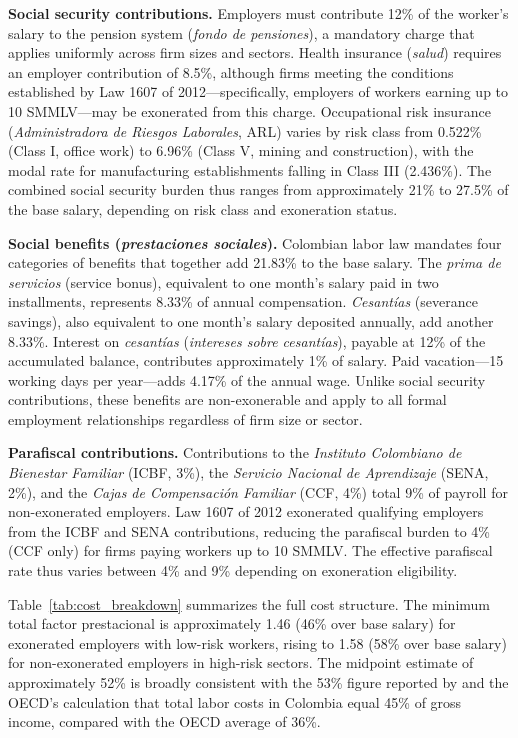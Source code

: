 \textbf{Social security contributions.} Employers must contribute 12\% of the worker's salary to the pension system (\textit{fondo de pensiones}), a mandatory charge that applies uniformly across firm sizes and sectors. Health insurance (\textit{salud}) requires an employer contribution of 8.5\%, although firms meeting the conditions established by Law 1607 of 2012---specifically, employers of workers earning up to 10 SMMLV---may be exonerated from this charge. Occupational risk insurance (\textit{Administradora de Riesgos Laborales}, ARL) varies by risk class from 0.522\% (Class I, office work) to 6.96\% (Class V, mining and construction), with the modal rate for manufacturing establishments falling in Class III (2.436\%). The combined social security burden thus ranges from approximately 21\% to 27.5\% of the base salary, depending on risk class and exoneration status.

\textbf{Social benefits (\textit{prestaciones sociales}).} Colombian labor law mandates four categories of benefits that together add 21.83\% to the base salary. The \textit{prima de servicios} (service bonus), equivalent to one month's salary paid in two installments, represents 8.33\% of annual compensation. \textit{Cesant\'ias} (severance savings), also equivalent to one month's salary deposited annually, add another 8.33\%. Interest on \textit{cesant\'ias} (\textit{intereses sobre cesant\'ias}), payable at 12\% of the accumulated balance, contributes approximately 1\% of salary. Paid vacation---15 working days per year---adds 4.17\% of the annual wage. Unlike social security contributions, these benefits are non-exonerable and apply to all formal employment relationships regardless of firm size or sector.

\textbf{Parafiscal contributions.} Contributions to the \textit{Instituto Colombiano de Bienestar Familiar} (ICBF, 3\%), the \textit{Servicio Nacional de Aprendizaje} (SENA, 2\%), and the \textit{Cajas de Compensaci\'on Familiar} (CCF, 4\%) total 9\% of payroll for non-exonerated employers. Law 1607 of 2012 exonerated qualifying employers from the ICBF and SENA contributions, reducing the parafiscal burden to 4\% (CCF only) for firms paying workers up to 10 SMMLV. The effective parafiscal rate thus varies between 4\% and 9\% depending on exoneration eligibility.

Table~\ref{tab:cost_breakdown} summarizes the full cost structure. The minimum total factor prestacional is approximately 1.46 (46\% over base salary) for exonerated employers with low-risk workers, rising to 1.58 (58\% over base salary) for non-exonerated employers in high-risk sectors. The midpoint estimate of approximately 52\% is broadly consistent with the 53\% figure reported by \cite{anif2018} and the OECD's calculation that total labor costs in Colombia equal 45\% of gross income, compared with the OECD average of 36\%.

